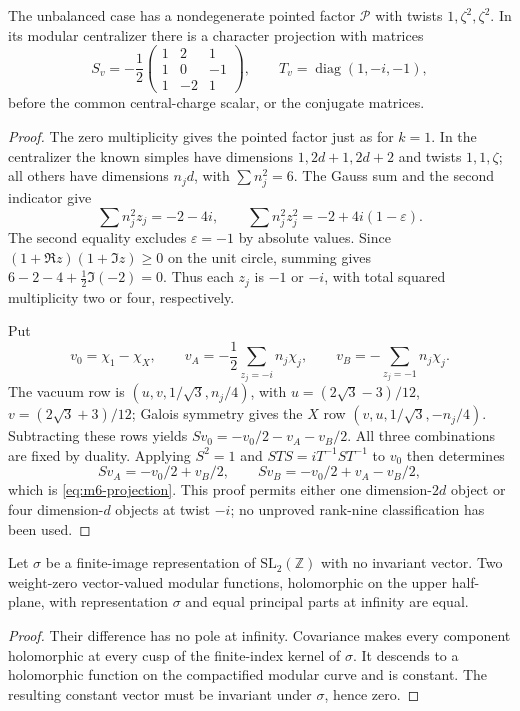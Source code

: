 \begin{lemma}
\label{lem:m6-projection}
The unbalanced case has a nondegenerate pointed factor $\mathcal P$
with twists $1,\zeta^2,\zeta^2$. In its modular centralizer there is
a character projection with matrices
\begin{equation}
 S_v=-\frac12\begin{pmatrix}1&2&1\\1&0&-1\\1&-2&1\end{pmatrix},
 \qquad T_v=\operatorname{diag}(1,-i,-1),
 \label{eq:m6-projection}
\end{equation}
before the common central-charge scalar, or the conjugate matrices.
\end{lemma}
\begin{proof}
The zero multiplicity gives the pointed factor just as for $k=1$.
In the centralizer the known simples have dimensions
$1,2d+1,2d+2$ and twists $1,1,\zeta$; all others have dimensions
$n_jd$, with $\sum n_j^2=6$.
The Gauss sum and the second indicator give
\[
 \sum n_j^2z_j=-2-4i,\qquad
 \sum n_j^2z_j^2=-2+4i(1-\varepsilon).
\]
The second equality excludes $\varepsilon=-1$ by absolute values.
Since $(1+\Re z)(1+\Im z)\ge0$ on the unit circle, summing gives
$6-2-4+\tfrac12\Im(-2)=0$. Thus each $z_j$ is $-1$ or $-i$,
with total squared multiplicity two or four, respectively.

Put
\[
 v_0=\chi_1-\chi_X,\qquad
 v_A=-\frac12\sum_{z_j=-i}n_j\chi_j,\qquad
 v_B=-\sum_{z_j=-1}n_j\chi_j.
\]
The vacuum row is $(u,v,1/\sqrt3,n_j/4)$, with
$u=(2\sqrt3-3)/12$, $v=(2\sqrt3+3)/12$; Galois symmetry gives
the $X$ row $(v,u,1/\sqrt3,-n_j/4)$.
Subtracting these rows yields
$Sv_0=-v_0/2-v_A-v_B/2$. All three combinations are fixed by
duality. Applying $S^2=1$ and
$STS=iT^{-1}ST^{-1}$ to $v_0$ then determines
\[
 Sv_A=-v_0/2+v_B/2,\qquad
 Sv_B=-v_0/2+v_A-v_B/2,
\]
which is \eqref{eq:m6-projection}. This proof permits either one
dimension-$2d$ object or four dimension-$d$ objects at twist $-i$;
no unproved rank-nine classification has been used.
\end{proof}

\begin{lemma}\label{lem:pole-cancellation}
Let $\sigma$ be a finite-image representation of
$\mathrm{SL}_2(\mathbb Z)$ with no invariant vector. Two weight-zero
vector-valued modular functions, holomorphic on the upper half-plane,
with representation $\sigma$ and equal principal parts at infinity
are equal.
\end{lemma}
\begin{proof}
Their difference has no pole at infinity. Covariance makes every
component holomorphic at every cusp of the finite-index kernel of
$\sigma$. It descends to a holomorphic function on the compactified
modular curve and is constant. The resulting constant vector must be
invariant under $\sigma$, hence zero.
\end{proof}

